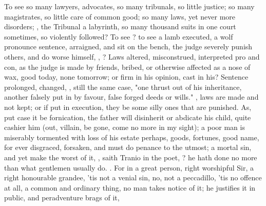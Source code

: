 To see so many lawyers, advocates, so many tribunals, so little justice; so
many magistrates, so little care of common good; so many laws, yet never more
disorders; , the Tribunal a labyrinth, so many
thousand suits in one court sometimes, so violently followed? To see
? to see a lamb
executed, a wolf pronounce sentence,  arraigned,
and  sit on the bench, the judge severely punish others, and do worse
himself, ,
? Laws altered,
misconstrued, interpreted pro and con, as the judge is made
by friends, bribed, or otherwise affected as a nose of wax, good today, none
tomorrow; or firm in his opinion, cast in his? Sentence prolonged, changed,
, still the same case, "one thrust
out of his inheritance, another falsely put in by favour, false forged deeds or
wills." , laws are made and not kept; or if put
in execution, they be some silly ones that are punished.
As, put case it be fornication, the father will disinherit or abdicate his
child, quite cashier him (out, villain, be gone, come no more in my sight); a
poor man is miserably tormented with loss of his estate perhaps, goods,
fortunes, good name, for ever disgraced, forsaken, and must do penance to the
utmost; a mortal sin, and yet make the worst of it, ,
saith Tranio in the poet, ? he hath done no more than what gentlemen usually do.
. For in a great person, right worshipful Sir, a right honourable
grandee, 'tis not a venial sin, no, not a peccadillo, 'tis no offence at all, a
common and ordinary thing, no man takes notice of it; he justifies it in
public, and peradventure brags of it,


